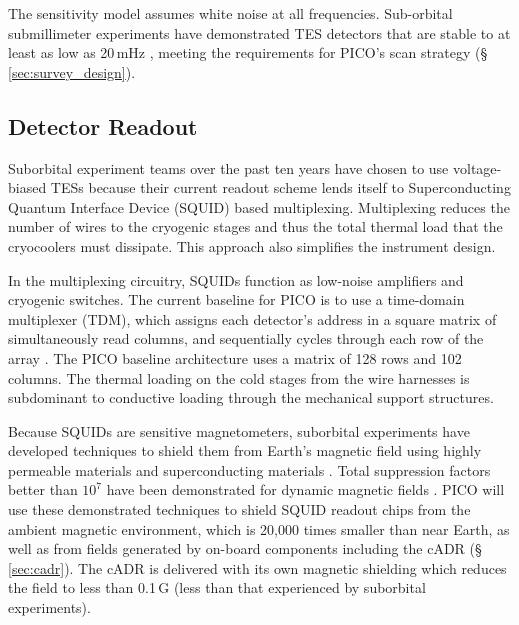 The sensitivity model assumes white noise at all frequencies. Sub-orbital submillimeter experiments have demonstrated TES detectors that are stable to at least as low as 20\,mHz \citep{Rahlin2014}, meeting the requirements for PICO's scan strategy (\S\,\ref{sec:survey_design}). %

\subsection{Detector Readout}
\label{sec:detector_readout} %

Suborbital experiment teams over the past ten years have chosen to use voltage-biased TESs because their current readout scheme lends itself to Superconducting Quantum Interface Device (SQUID) based multiplexing. Multiplexing reduces the number of wires to the cryogenic stages and thus the total thermal load that the cryocoolers must dissipate. This approach also simplifies the instrument design.

In the multiplexing circuitry, SQUIDs function as low-noise amplifiers and cryogenic switches. The current baseline for PICO is to use a time-domain multiplexer (TDM), which assigns each detector's address in a square matrix of simultaneously read columns, and sequentially cycles through each row of the array \citep{Henderson2016}. The PICO baseline architecture uses a matrix of 128 rows and 102 columns.
The thermal loading on the cold stages from the wire harnesses is subdominant to conductive loading through the mechanical support structures.

Because SQUIDs are sensitive magnetometers, suborbital experiments
have developed techniques to shield them from Earth's magnetic field
using highly permeable materials and superconducting materials
\citep{Hui2018}.  Total suppression factors better than $10^7$ have
been demonstrated for dynamic magnetic fields \citep{Runyan2010}. PICO
will use these demonstrated techniques to shield SQUID readout chips
from the ambient magnetic environment, which is 20,000 times smaller
than near Earth, as well as from fields generated by on-board
components including the cADR (\S\,\ref{sec:cadr}). The cADR is
delivered with its own magnetic shielding which reduces the field to
less than 0.1\,G (less than that experienced by suborbital
experiments).

